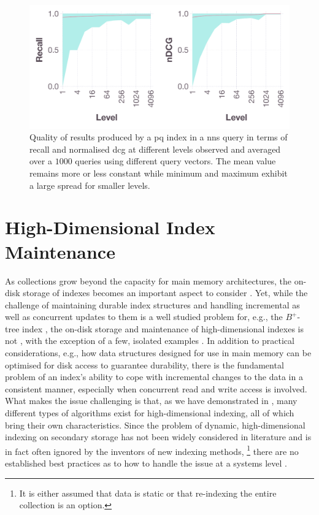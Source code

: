\begin{figure}
    \centering
    \includegraphics[width=\textwidth]{figures/index-quality-pq}
    \caption{Quality of results produced by a \acrshort{pq} index in a \acrshort{nns} query in terms of recall and normalised \acrshort{dcg} at different levels observed and averaged over a $1000$ queries using different query vectors. The mean value remains more or less constant while minimum and maximum exhibit a large spread for smaller levels.}
    \label{figure:index_quality}
\end{figure}

\section{High-Dimensional Index Maintenance}
\label{section:hd_index_maintenance}

As collections grow beyond the capacity for main memory architectures, the on-disk storage of indexes becomes an important aspect to consider \cite{Jayaram:2019DiskANN,Chen:2021SPANN}. Yet, while the challenge of maintaining durable index structures and handling incremental as well as concurrent updates to them is a well studied problem for, e.g., the $B^{+}$-tree index \cite{Garcia:2009Database,Petrov:2019Database}, the on-disk storage and maintenance of high-dimensional indexes is not \cite{Amsaleg:2014Database}, with the exception of a few, isolated examples \cite{Olafsson:2011Dynamic,Hojsgaard:2019Index,Lu:2020VHP}. In addition to practical considerations, e.g., how data structures designed for use in main memory can be optimised for disk access to guarantee durability, there is the fundamental problem of an index's ability to cope with incremental changes to the data in a consistent manner, especially when concurrent read and write access is involved. What makes the issue challenging is that, as we have demonstrated in , many different types of algorithms exist for high-dimensional indexing, all of which bring their own characteristics. Since the problem of dynamic, high-dimensional indexing on secondary storage has not been widely considered in literature and is in fact often ignored by the inventors of new indexing methods, \footnote{It is either assumed that data is static or that re-indexing the entire collection is an option.} there are no established best practices as to how to handle the issue at a systems level \cite{Olafsson:2011Dynamic,Amsaleg:2014Database}.

